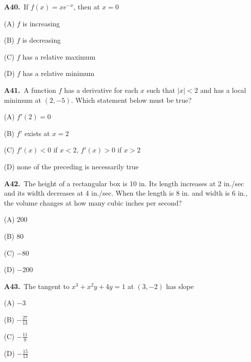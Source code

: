 \documentclass[11pt]{article}
\begin{document}
\bigskip\noindent\textbf{A40.}\ If $f(x) = xe^{-x}$, then at $x=0$
\begin{list}{}{\setlength{\leftmargin}{3em}\setlength{\labelwidth}{2.5em}\setlength{\itemsep}{0pt}\setlength{\topsep}{2pt}}
\item[(A)] $f$ is increasing
\item[(B)] $f$ is decreasing
\item[(C)] $f$ has a relative maximum
\item[(D)] $f$ has a relative minimum
\end{list}

\bigskip\noindent\textbf{A41.}\ A function $f$ has a derivative for each $x$ such that $|x|<2$ and has a local minimum at $(2,-5)$. Which statement below must be true?
\begin{list}{}{\setlength{\leftmargin}{3em}\setlength{\labelwidth}{2.5em}\setlength{\itemsep}{0pt}\setlength{\topsep}{2pt}}
\item[(A)] $f'(2) = 0$
\item[(B)] $f'$ exists at $x=2$
\item[(C)] $f'(x)<0$ if $x<2$, $f'(x)>0$ if $x>2$
\item[(D)] none of the preceding is necessarily true
\end{list}

\bigskip\noindent\textbf{A42.}\ The height of a rectangular box is 10 in. Its length increases at 2 in./sec and its width decreases at 4 in./sec. When the length is 8 in. and width is 6 in., the volume changes at how many cubic inches per second?
\begin{list}{}{\setlength{\leftmargin}{3em}\setlength{\labelwidth}{2.5em}\setlength{\itemsep}{0pt}\setlength{\topsep}{2pt}}
\item[(A)] $200$
\item[(B)] $80$
\item[(C)] $-80$
\item[(D)] $-200$
\end{list}

\bigskip\noindent\textbf{A43.}\ The tangent to $x^3+x^2y+4y=1$ at $(3,-2)$ has slope
\begin{list}{}{\setlength{\leftmargin}{3em}\setlength{\labelwidth}{2.5em}\setlength{\itemsep}{0pt}\setlength{\topsep}{2pt}}
\item[(A)] $-3$
\item[(B)] $-\frac{27}{13}$
\item[(C)] $-\frac{11}9$
\item[(D)] $-\frac{15}{13}$
\end{list}
\end{document}

